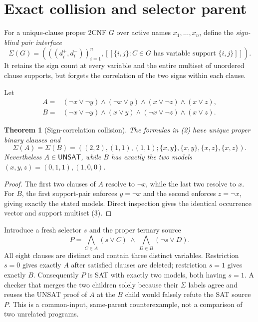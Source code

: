 \documentclass[11pt]{article}
\newtheorem{theorem}{Theorem}
\newcommand{\UNSAT}{\mathsf{UNSAT}}
\begin{document}
\section{Exact collision and selector parent}
For a unique-clause proper 2CNF $G$ over active names $x_1,\ldots,x_n$, define the
\emph{sign-blind pair interface}
\[
 \Sigma(G)=\left(
   ((d_i^+,d_i^-))_{i=1}^n,
   \left[\!\left[\{i,j\}: C\in G\text{ has variable support }\{i,j\}\right]\!\right]
 \right).                                                    \tag{1}
\]
It retains the sign count at every variable and the entire multiset of unordered clause
supports, but forgets the correlation of the two signs within each clause.

Let
\begin{align*}
 A={}&(\neg x\vee\neg y)\wedge(\neg x\vee y)
      \wedge(x\vee\neg z)\wedge(x\vee z),\\
 B={}&(\neg x\vee\neg y)\wedge(x\vee y)
      \wedge(\neg x\vee\neg z)\wedge(x\vee z).
                                                               \tag{2}
\end{align*}

\begin{theorem}[Sign-correlation collision]\label{th:collision}
The formulas in (2) have unique proper binary clauses and
\[
 \Sigma(A)=\Sigma(B)=((2,2),(1,1),(1,1);
        \{x,y\},\{x,y\},\{x,z\},\{x,z\}).                    \tag{3}
\]
Nevertheless $A\in\UNSAT$, while $B$ has exactly the two models
$(x,y,z)=(0,1,1),(1,0,0)$.
\end{theorem}
\begin{proof}
The first two clauses of $A$ resolve to $\neg x$, while the last two resolve
to $x$.  For $B$, the first support-pair enforces $y=\neg x$ and the second
enforces $z=\neg x$, giving exactly the stated models.  Direct inspection gives
the identical occurrence vector and support multiset (3).
\end{proof}

Introduce a fresh selector $s$ and the proper ternary source
\[
 P=\bigwedge_{C\in A}(s\vee C)\ \wedge\
   \bigwedge_{D\in B}(\neg s\vee D).                          \tag{4}
\]
All eight clauses are distinct and contain three distinct variables.  Restriction $s=0$
gives exactly $A$ after satisfied clauses are deleted; restriction $s=1$ gives exactly $B$.
Consequently $P$ is SAT with exactly two models, both having $s=1$.  A checker that merges
the two children solely because their $\Sigma$ labels agree and reuses the UNSAT proof of
$A$ at the $B$ child would falsely refute the SAT source $P$.  This is a common-input,
same-parent counterexample, not a comparison of two unrelated programs.
\end{document}
